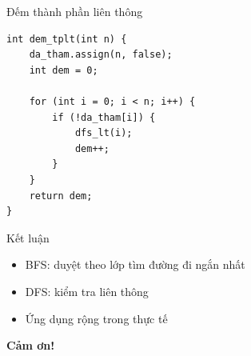 \documentclass{beamer}
\begin{document}
\begin{frame}[fragile]{Đếm thành phần liên thông}
\begin{tcolorbox}
\begin{lstlisting}
int dem_tplt(int n) {
    da_tham.assign(n, false);
    int dem = 0;

    for (int i = 0; i < n; i++) {
        if (!da_tham[i]) {
            dfs_lt(i);
            dem++;
        }
    }
    return dem;
}
\end{lstlisting}
\end{tcolorbox}
\end{frame}

\begin{frame}{Kết luận}
\begin{tcolorbox}
\begin{itemize}
\item \faStream BFS: duyệt theo lớp tìm đường đi ngắn nhất
\item \faProjectDiagram DFS: kiểm tra liên thông
\item \faRocket Ứng dụng rộng trong thực tế
\end{itemize}
\end{tcolorbox}

\centering
\Huge{\textbf{Cảm ơn!}}
\end{frame}
\end{document}
